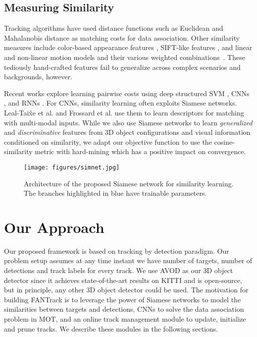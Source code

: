 \documentclass[letterpaper, 10 pt, conference]{ieeeconf}
\begin{document}
\subsection{Measuring Similarity}
Tracking algorithms have used distance functions such as Euclidean \cite{euclidean} and Mahalanobis distance \cite{mahalanobis} as matching costs for data association. Other similarity measures include color-based appearance features \cite{app2}, SIFT-like features \cite{sift}, and linear and non-linear motion models and their various weighted combinations~\cite{afld}. These tediously hand-crafted features fail to generalize across complex scenarios and backgrounds, however.
\par Recent works explore learning pairwise costs using deep structured SVM \cite{netflow}, CNNs \cite{quadcnn}, and RNNs \cite{amir}. For CNNs, similarity learning often exploits Siamese networks. Leal-Tai\^xe et al. \cite{leal-taixe} and Frossard et al. \cite{frossard} use them to learn descriptors for matching with multi-modal inputs. While we also use Siamese networks to learn \textit{generalized} and \textit{discriminative} features from 3D object configurations and visual information conditioned on similarity, we adapt our objective function to use the cosine-similarity metric with hard-mining which has a positive impact on convergence. 

\begin{figure*}[t]
\vspace{1.5em}
\begin{center}
\texttt{[image: figures/simnet.jpg]}
\end{center}
\caption{Architecture of the proposed Siamese network for similarity learning. The branches highlighted in blue have trainable parameters.}
\label{fig_simNet}
\vspace{-1.5em}
\end{figure*}






\section{Our Approach}
Our proposed framework is based on tracking by detection paradigm. Our problem setup assumes at any time instant  we have  number of targets,  number of detections and track labels for every  track. We use AVOD \cite{AVOD} as our 3D object detector since it achieves state-of-the-art results on KITTI and is open-source, but in principle, any other 3D object detector could be used. The motivation for building FANTrack is to leverage the power of Siamese networks to model the similarities between targets and detections, CNNs to solve the data association problem in MOT, and an online track management module to update, initialize and prune tracks. We describe these modules in the following sections. 
\end{document}
